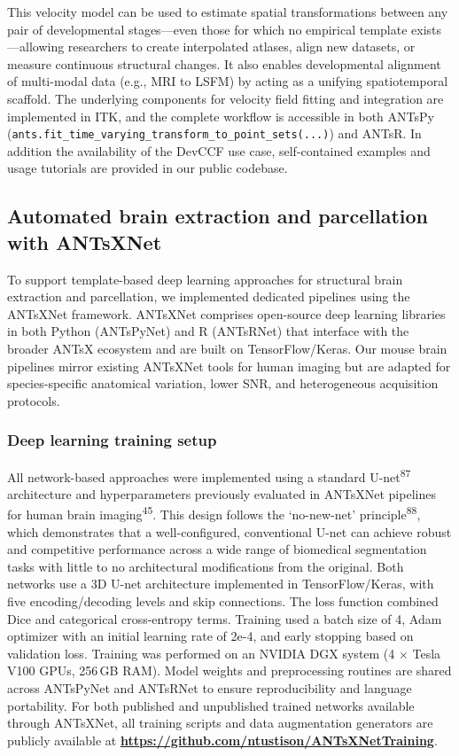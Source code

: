 \documentclass[
  12pt,
]{article}
\begin{document}
This velocity model can be used to estimate spatial transformations
between any pair of developmental stages---even those for which no
empirical template exists---allowing researchers to create interpolated
atlases, align new datasets, or measure continuous structural changes.
It also enables developmental alignment of multi-modal data (e.g., MRI
to LSFM) by acting as a unifying spatiotemporal scaffold. The underlying
components for velocity field fitting and integration are implemented in
ITK, and the complete workflow is accessible in both ANTsPy
(\texttt{ants.fit\_time\_varying\_transform\_to\_point\_sets(...)}) and
ANTsR. In addition the availability of the DevCCF use case,
self-contained examples and usage tutorials are provided in our public
codebase.

\subsection{Automated brain extraction and parcellation with
ANTsXNet}\label{automated-brain-extraction-and-parcellation-with-antsxnet}

To support template-based deep learning approaches for structural brain
extraction and parcellation, we implemented dedicated pipelines using
the ANTsXNet framework. ANTsXNet comprises open-source deep learning
libraries in both Python (ANTsPyNet) and R (ANTsRNet) that interface
with the broader ANTsX ecosystem and are built on TensorFlow/Keras. Our
mouse brain pipelines mirror existing ANTsXNet tools for human imaging
but are adapted for species-specific anatomical variation, lower SNR,
and heterogeneous acquisition protocols.

\subsubsection{Deep learning training
setup}\label{deep-learning-training-setup}

All network-based approaches were implemented using a standard
U-net\textsuperscript{87} architecture and hyperparameters previously
evaluated in ANTsXNet pipelines for human brain
imaging\textsuperscript{45}. This design follows the `no-new-net'
principle\textsuperscript{88}, which demonstrates that a
well-configured, conventional U-net can achieve robust and competitive
performance across a wide range of biomedical segmentation tasks with
little to no architectural modifications from the original. Both
networks use a 3D U-net architecture implemented in TensorFlow/Keras,
with five encoding/decoding levels and skip connections. The loss
function combined Dice and categorical cross-entropy terms. Training
used a batch size of 4, Adam optimizer with an initial learning rate of
2e-4, and early stopping based on validation loss. Training was
performed on an NVIDIA DGX system (4 \(\times\) Tesla V100 GPUs, 256\,GB
RAM). Model weights and preprocessing routines are shared across
ANTsPyNet and ANTsRNet to ensure reproducibility and language
portability. For both published and unpublished trained networks
available through ANTsXNet, all training scripts and data augmentation
generators are publicly available at
\textbf{\url{https://github.com/ntustison/ANTsXNetTraining}}.
\end{document}
